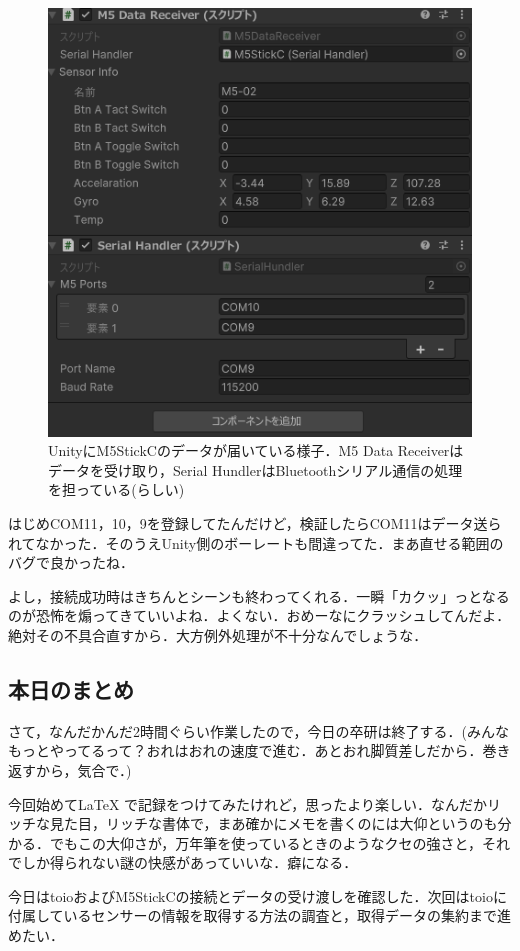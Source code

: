 \documentclass[fleqn,twocolumn]{mynote}
\begin{document}
  \begin{figure}[h]
    \label{m5-getting-sensor}
    \centering
    \includegraphics[keepaspectratio,
    width=0.7\columnwidth]{resources/m5stickc_getting_sensor.png}
    \caption[short]{UnityにM5StickCのデータが届いている様子．M5 Data
    Receiverはデータを受け取り，Serial HundlerはBluetoothシリアル通信の処理を担っている(らしい)}
  \end{figure}

  はじめCOM11，10，9を登録してたんだけど，検証したらCOM11はデータ送られてなかった．そのうえUnity側のボーレートも間違ってた．まあ直せる範囲のバグで良かったね．

  よし，接続成功時はきちんとシーンも終わってくれる．一瞬「カクッ」っとなるのが恐怖を煽ってきていいよね．よくない．おめーなにクラッシュしてんだよ．絶対その不具合直すから．大方例外処理が不十分なんでしょうな．

  \subsection*{本日のまとめ}
  さて，なんだかんだ2時間ぐらい作業したので，今日の卒研は終了する．(みんなもっとやってるって？おれはおれの速度で進む．あとおれ脚質差しだから．巻き返すから，気合で．)

  今回始めて\LaTeX
  で記録をつけてみたけれど，思ったより楽しい．なんだかリッチな見た目，リッチな書体で，まあ確かにメモを書くのには大仰というのも分かる．でもこの大仰さが，万年筆を使っているときのようなクセの強さと，それでしか得られない謎の快感があっていいな．癖になる．

  今日はtoioおよびM5StickCの接続とデータの受け渡しを確認した．次回はtoioに付属しているセンサーの情報を取得する方法の調査と，取得データの集約まで進めたい．
\end{document}
